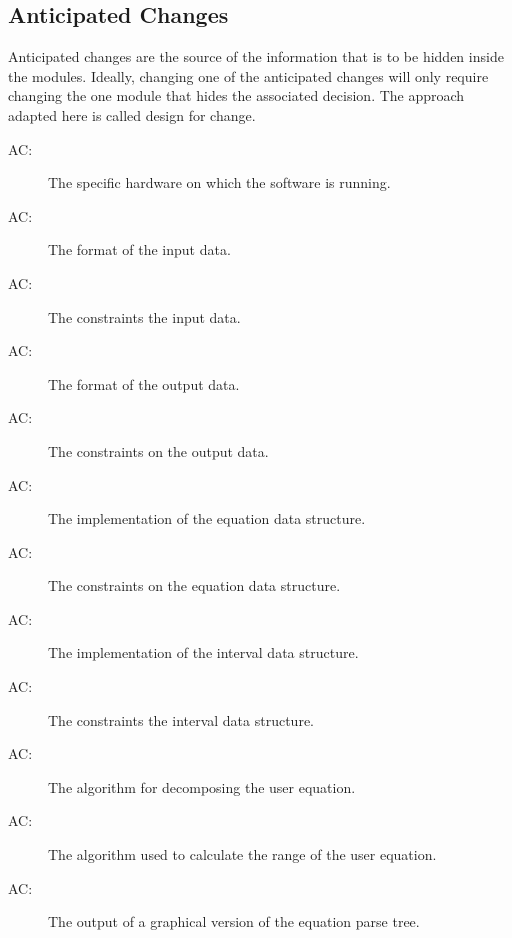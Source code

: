 \documentclass[12pt, titlepage]{article}
\newcounter{acnum}
\newcommand{\actheacnum}{AC\theacnum}
\begin{document}
\subsection{Anticipated Changes} \label{SecAchange}

Anticipated changes are the source of the information that is to be hidden
inside the modules. Ideally, changing one of the anticipated changes will only
require changing the one module that hides the associated decision. The approach
adapted here is called design for change.

\begin{description}
\item[ \actheacnum \label{acHardware}:] The specific
  hardware on which the software is running.
  
\item[ \actheacnum \label{acInput}:] The format of 
the input data.

\item[ \actheacnum \label{acInputConstraints}:] The 
constraints the input data.

\item[ \actheacnum \label{acOutput}:] The format of 
the output data.

\item[ \actheacnum \label{acOutputConstraints}:] The 
constraints on the output data.

\item[ \actheacnum \label{acEquationStruct}:] The 
implementation of the equation data structure.

\item[ \actheacnum \label{acEquationConstraints}:] The 
constraints on the equation data structure.

\item[ \actheacnum \label{acIntervalStruct}:] The 
implementation of the interval data structure.

\item[ \actheacnum \label{acIntervalConstraints}:] The 
constraints the interval data structure.

\item[ \actheacnum \label{acParsing}:] The algorithm for 
decomposing the user equation.

\item[ \actheacnum \label{acCalculationAlgorithm}:] The 
algorithm used to calculate the range of the user equation.

\item[ \actheacnum \label{acViewParse}:] The output of a 
graphical version of the equation parse tree.


\end{description}
\end{document}
